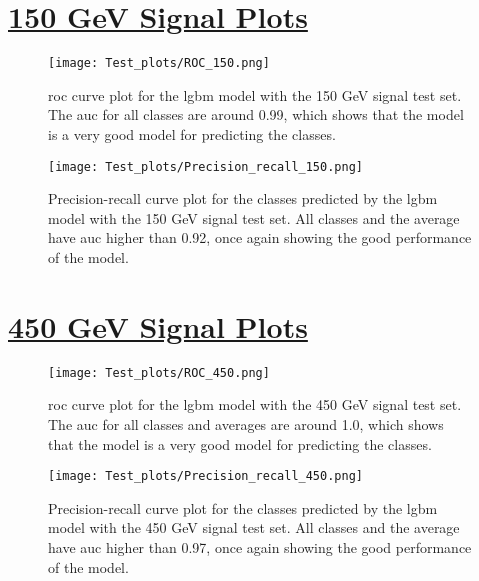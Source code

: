 \documentclass[a4paper, american, 12pt]{report}
\begin{document}
	\section{\underline{150 GeV Signal Plots}}
	\label{appendix_sect:150_Plots}
	\begin{figure}[h!tb]
		\centering\texttt{[image: Test\_plots/ROC\_150.png]}
		\caption[Test set \acrshort{roc} plot for the \acrshort{lgbm} model trained on the 150 GeV signal.]{\acrshort{roc} curve plot for the \acrshort{lgbm} model with the 150 GeV signal test set. The \acrshort{auc} for all classes are around 0.99, which shows that the model is a very good model for predicting the classes. \label{fig:ROCTest_150}}
	\end{figure}
	\begin{figure}[h!tb]
		\centering\texttt{[image: Test\_plots/Precision\_recall\_150.png]}
		\caption[Test set precision-recall plot for the \acrshort{lgbm} model trained on the 150 GeV signal.]{Precision-recall curve plot for the classes predicted by the \acrshort{lgbm} model with the 150 GeV signal test set. All classes and the average have \acrshort{auc} higher than 0.92, once again showing the good performance of the model. \label{fig:PrecisionRecallTest_150}}
	\end{figure}


	\section{\underline{450 GeV Signal Plots}}
	\label{appendix_sect:450_Plots}
	\begin{figure}[h!tb!]
		\centering\texttt{[image: Test\_plots/ROC\_450.png]}
		\caption[Test set \acrshort{roc} plot for the \acrshort{lgbm} model trained on the 450 GeV signal.]{\acrshort{roc} curve plot for the \acrshort{lgbm} model with the 450 GeV signal test set. The \acrshort{auc} for all classes and averages are around 1.0, which shows that the model is a very good model for predicting the classes. \label{fig:ROCTest_450}}
	\end{figure}
	\begin{figure}[h!tb]
		\centering\texttt{[image: Test\_plots/Precision\_recall\_450.png]}
		\caption[Test set precision-recall plot for the \acrshort{lgbm} model trained on the 450 GeV signal.]{Precision-recall curve plot for the classes predicted by the \acrshort{lgbm} model with the 450 GeV signal test set. All classes and the average have \acrshort{auc} higher than 0.97, once again showing the good performance of the model. \label{fig:PrecisionRecallTest_450}}
	\end{figure}


	
	

	\printglossary[type=\acronymtype]
	
	

	
	
\end{document}
